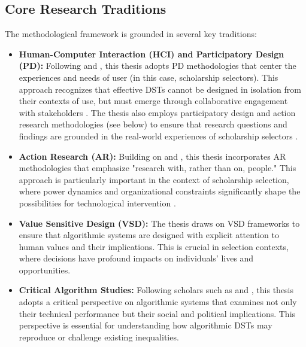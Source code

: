 \subsection{Core Research Traditions}\label{ssec:context_core_traditions}
The methodological framework is grounded in several key traditions:
\begin{itemize}
    \item \textbf{Human-Computer Interaction (HCI) and Participatory Design (PD):} Following \textcite{blythe2014research} and \textcite{Knapp_Zeratzky_Kowitz_2016}, this thesis adopts PD methodologies that center the experiences and needs of user (in this case, scholarship selectors). This approach recognizes that effective DSTs cannot be designed in isolation from their contexts of use, but must emerge through collaborative engagement with stakeholders \cite{braun_using_2006}. The thesis also employs participatory design and action research methodologies (see below) to ensure that research questions and findings are grounded in the real-world experiences of scholarship selectors \cite{Hayes_2011}.
    \item \textbf{Action Research (AR):} Building on \textcite{Hayes_2011} and \textcite{bradbury_action_2003}, this thesis incorporates AR methodologies that emphasize "research with, rather than on, people." This approach is particularly important in the context of scholarship selection, where power dynamics and organizational constraints significantly shape the possibilities for technological intervention \cite{lu_organizing_2023}.
    \item \textbf{Value Sensitive Design (VSD):} The thesis draws on VSD frameworks \cite{VanKleek_Seymour_Binns_Shadbolt_2018} to ensure that algorithmic systems are designed with explicit attention to human values and their implications. This is crucial in selection contexts, where decisions have profound impacts on individuals' lives and opportunities.
    \item \textbf{Critical Algorithm Studies:} Following scholars such as \textcite{noble2018algorithms} and \textcite{oneill2016weapons}, this thesis adopts a critical perspective on algorithmic systems that examines not only their technical performance but their social and political implications. This perspective is essential for understanding how algorithmic DSTs may reproduce or challenge existing inequalities.
\end{itemize}

